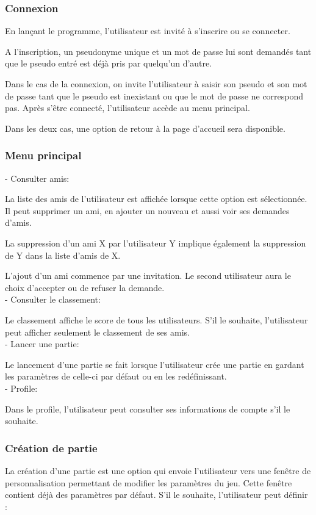 \documentclass[a4paper,12pt]{article}
\begin{document}
\subsubsection{Connexion}
En lançant le programme, l'utilisateur est invité à s'inscrire ou se connecter.

A l'inscription, un pseudonyme unique et un mot de passe lui sont demandés tant que le pseudo entré est déjà pris par quelqu'un d'autre.

Dans le cas de la connexion, on invite l'utilisateur à saisir son pseudo et son mot de passe tant que le pseudo est inexistant ou que le mot de passe ne correspond pas. Après s’être connecté, l'utilisateur accède au menu principal.

Dans les deux cas, une option de retour à la page d'accueil sera disponible.

\subsubsection{Menu principal}

- Consulter amis:

La liste des amis de l'utilisateur est affichée lorsque cette option est sélectionnée. Il peut supprimer un ami, en ajouter un nouveau et aussi voir ses demandes d'amis. 

La suppression d'un ami X par l'utilisateur Y implique également la suppression de Y dans la liste d'amis de X. 

L'ajout d'un ami commence par une invitation. Le second utilisateur aura le choix d'accepter ou de refuser la demande. \\

- Consulter le classement:

Le classement affiche le score de tous les utilisateurs. S'il le souhaite, l'utilisateur peut afficher seulement le classement de ses amis. \\

- Lancer une partie:

Le lancement d’une partie se fait lorsque l’utilisateur crée une partie en gardant les paramètres de celle-ci par défaut ou en les redéfinissant. \\

- Profile:

Dans le profile, l'utilisateur peut consulter ses informations de compte s'il le souhaite.

\subsubsection{Création de partie}
La création d'une partie est une option qui envoie l'utilisateur vers une fenêtre de personnalisation permettant de modifier les paramètres du jeu.
Cette fenêtre contient déjà des paramètres par défaut.
S'il le souhaite, l'utilisateur peut définir :
\end{document}
